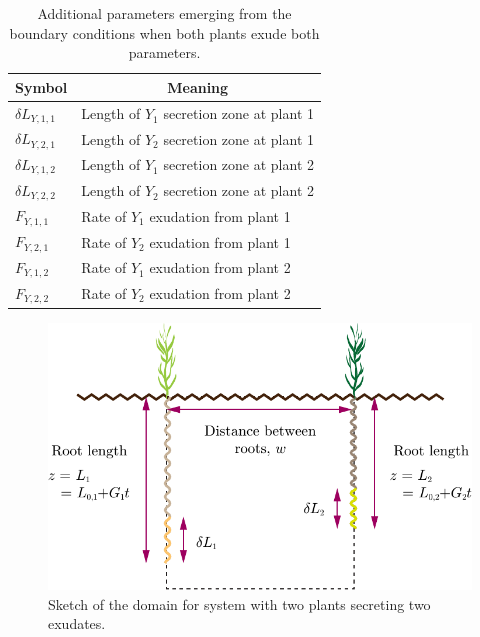 \documentclass[11pt]{article}
\begin{document}
	
\begin{table}[!htb]
\begin{center}
\fontsize{9.5}{7}\selectfont
\setlength{\tabcolsep}{5.pt}
\def\arraystretch{2.0}
\begin{tabular}{ll}
\toprule
    \bf Symbol & \multicolumn{1}{c}{\bf Meaning}
    \\ \midrule
	$\delta L_{Y,1,1}$ & Length of $Y_1$ secretion zone at plant 1  \\
	$\delta L_{Y,2,1}$ & Length of $Y_2$ secretion zone at plant 1  \\
	$\delta L_{Y,1,2}$ &  Length of $Y_1$ secretion zone at plant 2 \\
	$\delta L_{Y,2,2}$ &  Length of $Y_2$ secretion zone at plant 2 \\
    $F_{Y,1,1} $ & Rate of $Y_1$ exudation from plant 1 \\
	$F_{Y,2,1} $ & Rate of $Y_2$ exudation from plant 1 \\
	$F_{Y,1,2} $ & Rate of $Y_1$ exudation from plant 2 \\
	$F_{Y,2,2} $ & Rate of $Y_2$ exudation from plant 2 \\
\bottomrule
\end{tabular}
\caption{Additional parameters emerging from the boundary conditions when both plants exude both parameters.
\label{t:Boundary-additional-parameters}}
\end{center}
\end{table}

\begin{figure}[!htb]
    \centering
    \includegraphics[scale=0.7]{Figures/Third-plot.pdf}
    \caption{Sketch of the domain for system with two plants secreting two exudates.}
    \label{fig:2roots-b}
\end{figure}
\end{document}
